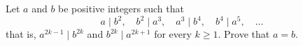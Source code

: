 Let $a$ and $b$ be positive integers such that
\[
a\mid b^2,\quad b^2\mid a^3,\quad a^3\mid b^4,\quad b^4\mid a^5,\quad\dots
\]
that is, $a^{2k-1}\mid b^{2k}$ and $b^{2k}\mid a^{2k+1}$ for every $k\ge1$. Prove that $a=b$.
